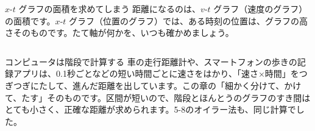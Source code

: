 \begin{tsumazuki}{$x$-$t$ グラフの面積を求めてしまう}
距離になるのは、$v$-$t$ グラフ（速度のグラフ）の面積です。$x$-$t$ グラフ（位置のグラフ）では、ある時刻の位置は、グラフの高さそのものです。たて軸が何かを、いつも確かめましょう。
\end{tsumazuki}

\begin{column}{コンピュータは階段で計算する}
車の走行距離計や、スマートフォンの歩きの記録アプリは、0.1秒ごとなどの短い時間ごとに速さをはかり、「速さ×時間」をつぎつぎにたして、進んだ距離を出しています。この章の「細かく分けて、かけて、たす」そのものです。区間が短いので、階段とほんとうのグラフのすき間はとても小さく、正確な距離が求められます。5-8のオイラー法も、同じ計算でした。
\end{column}


